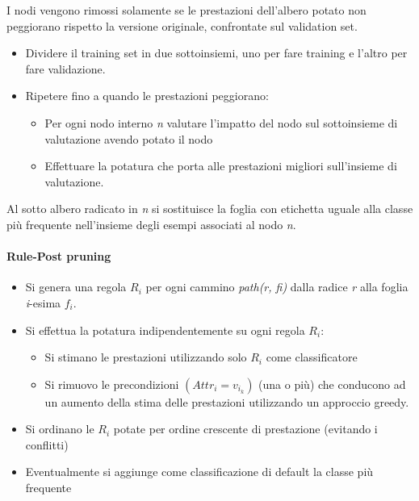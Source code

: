 I nodi vengono rimossi solamente se le prestazioni dell'albero potato
non peggiorano rispetto la versione originale, confrontate sul
validation set.

\begin{itemize}
\item
  Dividere il training set in due sottoinsiemi, uno per fare training e
  l'altro per fare validazione.
\item
  Ripetere fino a quando le prestazioni peggiorano:
  \begin{itemize}
  \item
    Per ogni nodo interno \emph{n} valutare l'impatto del nodo sul
    sottoinsieme di valutazione avendo potato il nodo
  \item
    Effettuare la potatura che porta alle prestazioni migliori
    sull'insieme di valutazione.
  \end{itemize}
\end{itemize}

Al sotto albero radicato in \emph{n} si sostituisce la foglia con
etichetta uguale alla classe più frequente nell'insieme degli esempi
associati al nodo \emph{n}.

\paragraph{Rule-Post pruning}\label{rule-post-pruning}

\begin{itemize}
\item
  Si genera una regola $R_i$ per ogni cammino \emph{path(r, fi)}
  dalla radice \emph{r} alla foglia \emph{i}-esima $f_i$.
\item
  Si effettua la potatura indipendentemente su ogni regola $R_i$:

  \begin{itemize}
  \item
    Si stimano le prestazioni utilizzando solo $R_i$ come
    classificatore
  \item
    Si rimuovo le precondizioni $ (Attr_{i} = v_{i_k})$ (una o più) che conducono ad un aumento
    della stima delle prestazioni utilizzando un approccio greedy.
  \end{itemize}
\item
  Si ordinano le $R_i$ potate per ordine crescente di prestazione
  (evitando i conflitti)
\item
  Eventualmente si aggiunge come classificazione di default la classe più
  frequente
\end{itemize}

